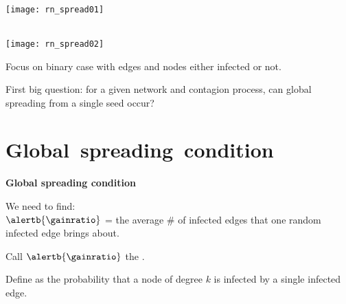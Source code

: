           
          \\
          \texttt{[image: rn\_spread01]}
                
        
                  
          
          \\
          \texttt{[image: rn\_spread02]}
                
         
    Focus on \alert{binary} case with edges and nodes
    either infected or not.
  
    \alert{First big question:} for a given network
    and contagion process, can global spreading from
    a single seed occur?
  


\section{Global\ spreading\ condition}

  \textbf{Global spreading condition}

  
  
    We need to find:\cite{dodds2011b}\\
    $\alertb{\gainratio}$ = the average \# of infected
    edges that one random infected edge brings about.
  
    Call $\alertb{\gainratio}$ the .
   
    Define  as the probability that
    a node of degree $k$ is infected by
    a single infected edge.
  
